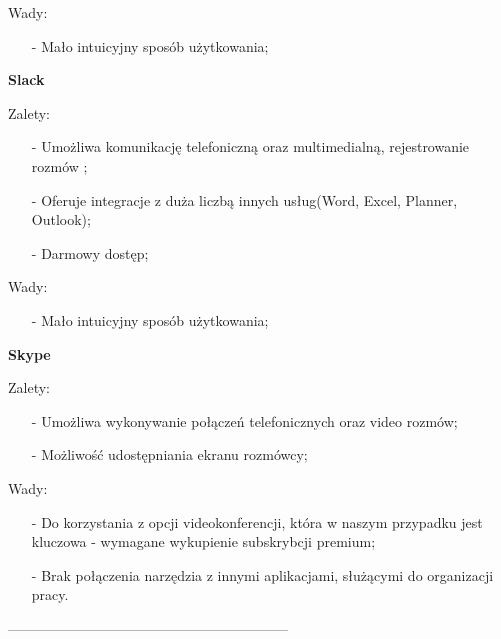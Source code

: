 \documentclass[a4paper,titleauthor]{mwart}
\begin{document}
	\indent
	
	Wady:
	\begin{itemize}
		
		\item[-]
		Mało intuicyjny sposób użytkowania;
	\end{itemize}
	\vspace{0,8cm}
	
	\textbf{Slack} \newline
	\indent
	
	Zalety:
	\begin{itemize}
		
		\item[-]
		Umożliwa komunikację telefoniczną oraz multimedialną, rejestrowanie rozmów ;
		
		\item[-]
		Oferuje integracje z duża liczbą innych usług(Word, Excel, Planner, Outlook);
		
		\item[-]
		Darmowy dostęp;
		
		
	\end{itemize}
	
	\indent
	
	Wady:
	\begin{itemize}
		
		\item[-]
		Mało intuicyjny sposób użytkowania;
	\end{itemize}
	
	\vspace{0,8cm}
	\textbf{Skype} \newline
	\indent
	
	Zalety:
	\begin{itemize}
		
		\item[-]
		Umożliwa wykonywanie połączeń telefonicznych oraz video rozmów;
		
		\item[-]
		Możliwość udostępniania ekranu rozmówcy;
		
	\end{itemize}
	
	\indent
	
	Wady:
	\begin{itemize}
		
		\item[-]
		Do korzystania z opcji videokonferencji, która w naszym przypadku jest kluczowa - wymagane wykupienie subskrybcji premium;
		
		\item[-]
		Brak połączenia narzędzia z innymi aplikacjami, służącymi do organizacji pracy.
	\end{itemize}
	------------------------------------------------------------\newline \newline
	 \newline 
	
\end{document}

